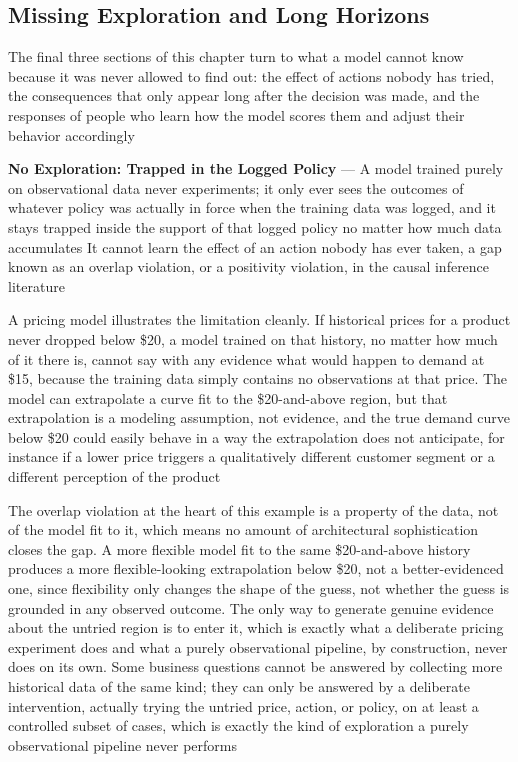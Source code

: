 \subsection{Missing Exploration and Long Horizons}
\label{sec:missing-exploration-long-horizons}

The final three sections of this chapter turn to what a model cannot know
because it was never allowed to find out: the effect of actions nobody has tried,
the consequences that only appear long after the decision was made, and the responses
of people who learn how the model scores them and adjust their behavior accordingly

\textbf{No Exploration: Trapped in the Logged Policy} --- A model trained purely
on observational data never experiments; it only ever sees the outcomes of
whatever policy was actually in force when the training data was logged, and it stays
trapped inside the support of that logged policy no matter how much data accumulates
It cannot learn the effect of an action nobody has ever taken, a gap known as an
overlap violation, or a positivity violation, in the causal inference literature

A pricing model illustrates the limitation cleanly. If historical prices for a product
never dropped below \$20, a model trained on that history, no matter how much of
it there is, cannot say with any evidence what would happen to demand at \$15, because
the training data simply contains no observations at that price. The model can
extrapolate a curve fit to the \$20-and-above region, but that extrapolation is
a modeling assumption, not evidence, and the true demand curve below \$20 could easily
behave in a way the extrapolation does not anticipate, for instance if a lower
price triggers a qualitatively different customer segment or a different
perception of the product

The overlap violation at the heart of this example is a property of the data,
not of the model fit to it, which means no amount of architectural sophistication
closes the gap. A more flexible model fit to the same \$20-and-above history produces
a more flexible-looking extrapolation below \$20, not a better-evidenced one,
since flexibility only changes the shape of the guess, not whether the guess is grounded
in any observed outcome. The only way to generate genuine evidence about the
untried region is to enter it, which is exactly what a deliberate pricing experiment
does and what a purely observational pipeline, by construction, never does on its
own. Some business questions cannot be answered by collecting more historical
data of the same kind; they can only be answered by a deliberate intervention,
actually trying the untried price, action, or policy, on at least a controlled subset
of cases, which is exactly the kind of exploration a purely observational
pipeline never performs

